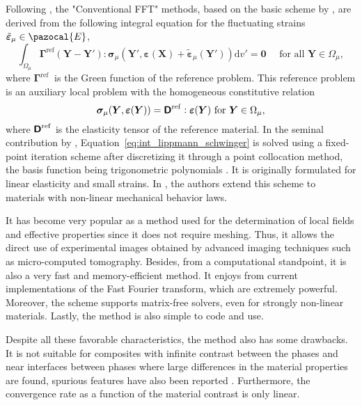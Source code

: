 Following \cite{zeman_finite_2017}, the "Conventional FFT" methods, based on the basic scheme by \cite{moulinec_fast_1994}, are derived from the following integral equation for the fluctuating strains \(\tilde{\bm\varepsilon}_\mu \in \pazocal{E}\),
\begin{equation} \label{eq:int_lippmann_schwinger}
\int_{\Omega_\mu} \bm \Gamma^{\mathrm{ref}}(\bm{Y}-\bm{Y}'): \bm{\sigma}_\mu\left(\bm{Y}', \bm{\varepsilon}(\bm X)+\tilde{\bm \varepsilon}_\mu(\bm{Y}')\right) \mathrm{d} v'=\mathbf{0}\quad \text { for all } \bm{Y} \in \Omega_\mu,
\end{equation}
where \(\bm \Gamma^{\text {ref }}\) is the Green function of the reference problem.
This reference problem is an auxiliary local problem with the homogeneous constitutive relation
\begin{equation}
\bm \sigma_\mu(\bm{Y}, \bm \varepsilon(\bm{Y}))=\boldsymbol{\mathsf{D}}^{\mathrm{ref}}: \bm\varepsilon(\bm{Y}) \text { for } \bm{Y} \in \Omega_\mu,
\end{equation}
where \(\boldsymbol{\mathsf{D}}^\mathrm{ref}\) is the elasticity tensor of the reference material.
In the seminal contribution by \cite{moulinec_fast_1994, moulinec_fft-based_1995}, Equation~\eqref{eq:int_lippmann_schwinger} is solved using a fixed-point iteration scheme after discretizing it through a point collocation method, the basis function being trigonometric polynomials \citep{zeman_finite_2017}.
It is originally formulated for linear elasticity and small strains.
In \cite{michel_computational_2000, michel_computational_2001}, the authors extend this scheme to materials with non-linear mechanical behavior laws.

It has become very popular as a method used for the determination of local fields and effective properties since it does not require meshing.
Thus, it allows the direct use of experimental images obtained by advanced imaging techniques such as micro-computed tomography.
Besides, from a computational standpoint, it is also a very fast and memory-efficient method.
It enjoys from current implementations of the Fast Fourier transform, which are extremely powerful.
Moreover, the scheme supports matrix-free solvers, even for strongly non-linear materials.
Lastly, the method is also simple to code and use.

Despite all these favorable characteristics, the method also has some drawbacks.
It is not suitable for composites with infinite contrast between the phases and near interfaces between phases where large differences in the material properties are found, spurious features have also been reported \citep{ma_numerical_2021}.
Furthermore, the convergence rate as a function of the material contrast is only linear.

